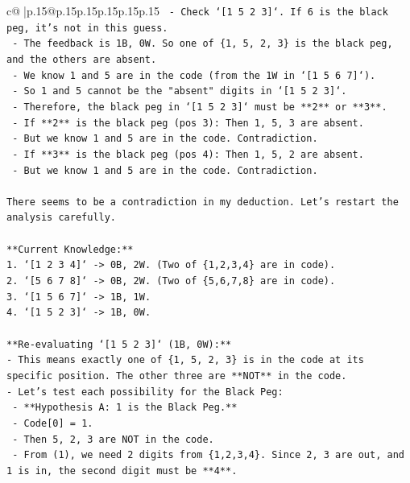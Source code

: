 \documentclass{article}
\begin{document}
{\begin{supertabular}{c@{$\;$}|p{.15\linewidth}@{}p{.15\linewidth}p{.15\linewidth}p{.15\linewidth}p{.15\linewidth}p{.15\linewidth}}
{{{\texttt{    {-}   Check `{[}1 5 2 3{]}`. If 6 is the black peg, it's not in this guess.} \\
\texttt{    {-}   The feedback is 1B, 0W. So one of \{1, 5, 2, 3\} is the black peg, and the others are absent.} \\
\texttt{    {-}   We know 1 and 5 are in the code (from the 1W in `{[}1 5 6 7{]}`).} \\
\texttt{    {-}   So 1 and 5 cannot be the "absent" digits in `{[}1 5 2 3{]}`.} \\
\texttt{    {-}   Therefore, the black peg in `{[}1 5 2 3{]}` must be **2** or **3**.} \\
\texttt{    {-}   If **2** is the black peg (pos 3): Then 1, 5, 3 are absent.} \\
\texttt{        {-}   But we know 1 and 5 are in the code. Contradiction.} \\
\texttt{    {-}   If **3** is the black peg (pos 4): Then 1, 5, 2 are absent.} \\
\texttt{        {-}   But we know 1 and 5 are in the code. Contradiction.} \\
\\ 
\texttt{There seems to be a contradiction in my deduction. Let's restart the analysis carefully.} \\
\\ 
\texttt{**Current Knowledge:**} \\
\texttt{1.  `{[}1 2 3 4{]}` {-}> 0B, 2W. (Two of \{1,2,3,4\} are in code).} \\
\texttt{2.  `{[}5 6 7 8{]}` {-}> 0B, 2W. (Two of \{5,6,7,8\} are in code).} \\
\texttt{3.  `{[}1 5 6 7{]}` {-}> 1B, 1W.} \\
\texttt{4.  `{[}1 5 2 3{]}` {-}> 1B, 0W.} \\
\\ 
\texttt{**Re{-}evaluating `{[}1 5 2 3{]}` (1B, 0W):**} \\
\texttt{{-}   This means exactly one of \{1, 5, 2, 3\} is in the code at its specific position. The other three are **NOT** in the code.} \\
\texttt{{-}   Let's test each possibility for the Black Peg:} \\
\texttt{    {-}   **Hypothesis A: 1 is the Black Peg.**} \\
\texttt{        {-}   Code{[}0{]} = 1.} \\
\texttt{        {-}   Then 5, 2, 3 are NOT in the code.} \\
\texttt{        {-}   From (1), we need 2 digits from \{1,2,3,4\}. Since 2, 3 are out, and 1 is in, the second digit must be **4**.} \\
}}}
\end{supertabular}}
\end{document}
